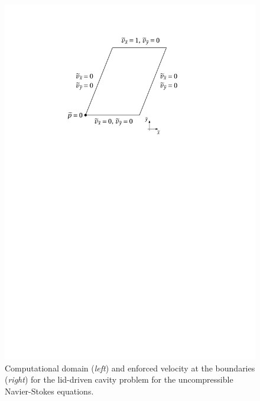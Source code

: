 \documentclass[12pt, a4paper, twoside, openright, notitlepage]{report}
\numberwithin{equation}{chapter}
\theoremstyle{theorem}
\theoremstyle{definition}
\theoremstyle{remark}
\theoremstyle{proposition}
\numberwithin{figure}{chapter}
\begin{document}
\begin{figure}[t!]
			\includegraphics[scale = 0.7]{dc_domain_bc}
			
			\caption{Computational domain (\emph{left}) and enforced velocity at the boundaries (\emph{right}) for the lid-driven cavity problem for the uncompressible Navier-Stokes equations.}
			\label{fig:dc-domain}
		\end{figure}
				
				
\end{document}
